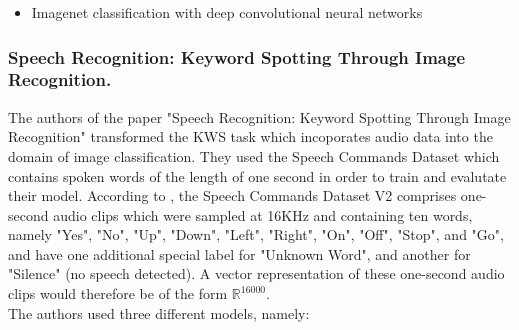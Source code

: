 \documentclass{article}
\theoremstyle{definition}
\theoremstyle{remark}
\begin{document}
\begin{itemize}
	\item Imagenet classification with deep convolutional neural networks \cite{krizhevsky2012imagenet}
\end{itemize}

\subsubsection{Speech Recognition: Keyword Spotting Through Image Recognition.}

The authors of the paper "Speech Recognition: Keyword Spotting Through Image Recognition" \cite{gouda2018speech} transformed the KWS task which incoporates audio data into the domain of image classification. They used the Speech Commands Dataset \cite{warden2018speech} which contains spoken words of the length of one second in order to train and evalutate their model. According to \cite{warden2018speech}, the Speech Commands Dataset V2 \cite{scd_v2} comprises one-second audio clips which were sampled at 16KHz and containing ten words, namely "Yes", "No", "Up", "Down", "Left", "Right", "On", "Off", "Stop", and "Go", and have one additional special label for "Unknown Word", and another for "Silence" (no speech detected). A vector representation of these one-second audio clips would therefore be of the form  $\mathbb{R}^{16000}$.\\

The authors used three different models, namely:
\end{document}

